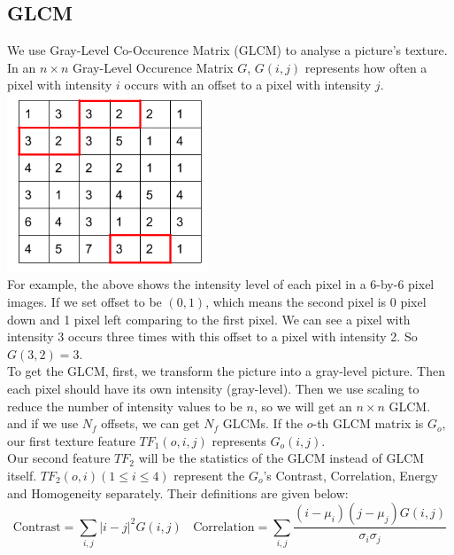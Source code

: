 \documentclass[12pt]{article}
\begin{document}
\subsection{GLCM}
We use Gray-Level Co-Occurence Matrix (GLCM) to analyse a picture's texture. In an $n \times n$ Gray-Level Occurence Matrix $G$, $G(i, j)$ represents how often a pixel with intensity $i$ occurs with an offset to a pixel with intensity $j$. \\
\includegraphics[width = 6cm]{glcm} \\
For example, the above shows the intensity level of each pixel in a 6-by-6 pixel images. If we set offset to be $(0,1)$, which means the second pixel is 0 pixel down and 1 pixel left comparing to the first pixel. We can see a pixel with intensity 3 occurs three times with this offset to a pixel with intensity 2. So $G(3,2) = 3$.\\
To get the GLCM, first, we transform the picture into a gray-level picture. Then each pixel should have its own intensity (gray-level). Then we use scaling to reduce the number of intensity values to be $n$, so we will get an $n \times n$ GLCM. and if we use $N_f$ offsets, we can get $N_f$ GLCMs. If the $o$-th GLCM matrix is $G_o$, our first texture feature $TF_1(o,i,j)$ represents $G_o(i, j)$. \\
Our second feature $TF_2$ will be the statistics of the GLCM instead of GLCM itself. $TF_2(o, i) (1 \leq i \leq 4)$ represent the $G_o$'s Contrast, Correlation, Energy and Homogeneity separately.
Their definitions are given below: \\
$$ \mathrm{Contrast} = \sum_{i,j}|i-j|^2 G(i,j) ~~~~
 \mathrm{Correlation} = \sum_{i,j}\frac{(i - \mu_i)(j - \mu_j)G(i,j)}{\sigma_i \sigma_j} $$
\end{document}
